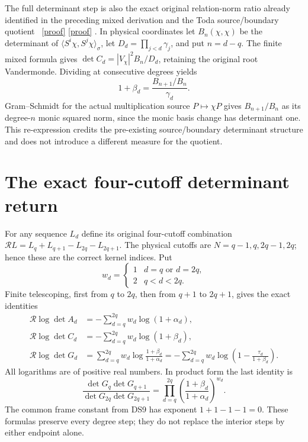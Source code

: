 The full determinant step is also the exact original relation-norm
ratio already identified in the preceding mixed derivation and the
Toda source/boundary quotient \cite{dsroot:Mixed,dsroot:Toda}%
~\href{https://github.com/KokunoYumeto/zeta-function-research-reader/blob/5992ad50c0f2a06921f1fcaded7b4e38097c0739/workbenches/splitzero-tandem/continuations/20260920-original-kernel-mixed-determinants/MIXED_CONFLUENT_PROOF.tex\#L1}{[proof]} \href{https://github.com/KokunoYumeto/zeta-function-research-reader/blob/5992ad50c0f2a06921f1fcaded7b4e38097c0739/workbenches/splitzero-tandem/continuations/20260920-original-kernel-mixed-determinants/providers/TODA_VOLUME_CONTROL.tex\#L1}{[proof]}%
{}. In physical coordinates
let \(B_n(\chi,\chi)\) be the determinant of
\(\langle S^i\chi,S^j\chi\rangle_\sigma\), let
\(D_d=\prod_{j<d}\gamma_j\), and put \(n=d-q\).
The finite mixed formula gives
\(\det C_d=|V_\chi|^2B_n/D_d\), retaining the original root
Vandermonde. Dividing at consecutive degrees yields
\[
1+\beta_d=\frac{B_{n+1}/B_n}{\gamma_d}.
\]
Gram--Schmidt for the actual multiplication source
\(P\mapsto\chi P\) gives \(B_{n+1}/B_n\) as its degree-\(n\)
monic squared norm, since the monic basis change has determinant one.
This re-expression credits the pre-existing source/boundary determinant
structure and does not introduce a different measure for the quotient.

\section{The exact four-cutoff determinant return}

For any sequence \(L_d\) define its original four-cutoff combination
\(\mathcal RL=L_q+L_{q+1}-L_{2q}-L_{2q+1}\).
The physical cutoffs are \(N=q-1,q,2q-1,2q\); hence these are the
correct kernel indices. Put
\[
w_d=\begin{cases}1&d=q\text{ or }d=2q,\\2&q<d<2q.\end{cases}
\]
Finite telescoping, first from \(q\) to \(2q\), then from \(q+1\)
to \(2q+1\), gives the exact identities
\begin{equation}\label{dsroot:eq:return}
\boxed{\begin{aligned}
\mathcal R\log\det A_d
&=-\sum_{d=q}^{2q}w_d\log(1+\alpha_d),\\
\mathcal R\log\det C_d
&=-\sum_{d=q}^{2q}w_d\log(1+\beta_d),\\
\mathcal R\log\det G_d
&=\sum_{d=q}^{2q}w_d
 \log\frac{1+\beta_d}{1+\alpha_d}
=-\sum_{d=q}^{2q}w_d
 \log\left(1-\frac{\tau_d}{1+\beta_d}\right).
\end{aligned}}
\tag{DS13}
\end{equation}
All logarithms are of positive real numbers. In product form the last
identity is
\[
\frac{\det G_q\det G_{q+1}}{\det G_{2q}\det G_{2q+1}}
=\prod_{d=q}^{2q}\left(\frac{1+\beta_d}{1+\alpha_d}\right)^{w_d}.
\]
The common frame constant from DS9 has exponent \(1+1-1-1=0\).
These formulas preserve every degree step; they do not replace the
interior steps by either endpoint alone.

